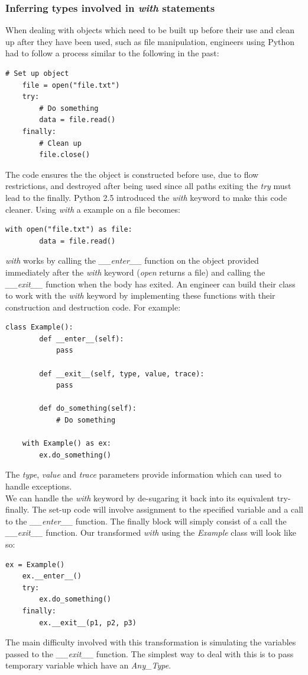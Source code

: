 \documentclass[12pt, titlepage]{article}
\begin{document}
\subsubsection{Inferring types involved in \textit{with} statements}
When dealing with objects which need to be built up before their use and clean up after they have been used, such as file manipulation, engineers using Python had to follow a process similar to the following in the past:
\begin{lstlisting}[mathescape]
	# Set up object
	file = open("file.txt")
	try:
		# Do something
		data = file.read()
	finally:
		# Clean up
		file.close()
\end{lstlisting}
The code ensures the the object is constructed before use, due to flow restrictions, and destroyed after being used since all paths exiting the \textit{try} must lead to the finally. Python 2.5 introduced the \textit{with} keyword to make this code cleaner. Using \textit{with} a example on a file becomes:
\begin{lstlisting}[mathescape]
	with open("file.txt") as file:
		data = file.read()
\end{lstlisting}
\textit{with} works by calling the \textit{\_\_enter\_\_} function on the object provided immediately after the \textit{with} keyword (\textit{open} returns a file) and calling the \textit{\_\_exit\_\_} function when the body has exited. An engineer can build their class to work with the \textit{with} keyword by implementing these functions with their construction and destruction code. For example:
\begin{lstlisting}[mathescape]
	class Example():
		def __enter__(self):
			pass
			
		def __exit__(self, type, value, trace):
			pass
			
		def do_something(self):
			# Do something
			
	with Example() as ex:
		ex.do_something()
\end{lstlisting}
The \textit{type}, \textit{value} and \textit{trace} parameters provide information which can used to handle exceptions. \\
We can handle the \textit{with} keyword by de-sugaring it back into its equivalent try-finally. The set-up code will involve assignment to the specified variable and a call to the \textit{\_\_enter\_\_} function. The finally block will simply consist of a call the \textit{\_\_exit\_\_} function. Our transformed \textit{with} using the \textit{Example} class will look like so:
\begin{lstlisting}[mathescape]
	ex = Example()
	ex.__enter__()
	try:
		ex.do_something()
	finally:
		ex.__exit__(p1, p2, p3)
\end{lstlisting}
The main difficulty involved with this transformation is simulating the variables passed to the \textit{\_\_exit\_\_} function. The simplest way to deal with this is to pass temporary variable which have an \textit{Any\_Type}.
\end{document}
